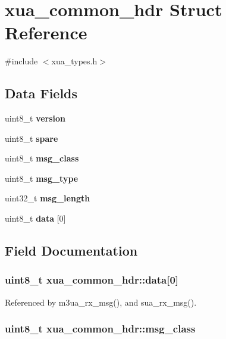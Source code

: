 \section{xua\+\_\+common\+\_\+hdr Struct Reference}
\label{structxua__common__hdr}


{\ttfamily \#include $<$xua\+\_\+types.\+h$>$}

\subsection*{Data Fields}
\begin{DoxyCompactItemize}
\item 
uint8\+\_\+t {\bf version}
\item 
uint8\+\_\+t {\bf spare}
\item 
uint8\+\_\+t {\bf msg\+\_\+class}
\item 
uint8\+\_\+t {\bf msg\+\_\+type}
\item 
uint32\+\_\+t {\bf msg\+\_\+length}
\item 
uint8\+\_\+t {\bf data} [0]
\end{DoxyCompactItemize}


\subsection{Field Documentation}
\subsubsection[{data}]{\setlength{\rightskip}{0pt plus 5cm}uint8\+\_\+t xua\+\_\+common\+\_\+hdr\+::data[0]}\label{structxua__common__hdr_a23382add9ec243b107ce804b9ddeb2d0}


Referenced by m3ua\+\_\+rx\+\_\+msg(), and sua\+\_\+rx\+\_\+msg().

\subsubsection[{msg\+\_\+class}]{\setlength{\rightskip}{0pt plus 5cm}uint8\+\_\+t xua\+\_\+common\+\_\+hdr\+::msg\+\_\+class}\label{structxua__common__hdr_ae96db82ef3dc823ea0ffa7b9c40b7c4c}



